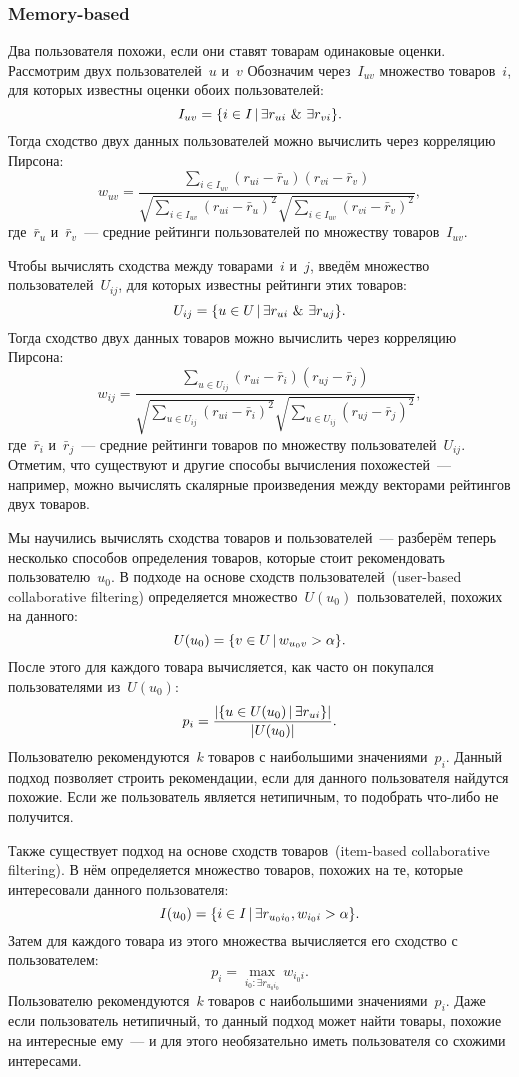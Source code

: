 \documentclass[12pt,fleqn]{article}
\begin{document}
	\subsubsection{Memory-based}
	Два пользователя похожи, если они ставят товарам одинаковые оценки.
	Рассмотрим двух пользователей~$u$ и~$v$
	Обозначим через~$I_{uv}$ множество товаров~$i$, для которых известны
	оценки обоих пользователей:
	\[
	I_{uv}
	=
	\{
	i \in I
	\cond
	\exists r_{ui}
	\ \&\ 
	\exists r_{vi}
	\}.
	\]
	Тогда сходство двух данных пользователей можно вычислить через корреляцию Пирсона:
	\[
	w_{uv}
	=
	\frac{
		\sum_{i \in I_{uv}}
		(r_{ui} - \bar r_u)
		(r_{vi} - \bar r_v)
	}{
		\sqrt{
			\sum_{i \in I_{uv}}
			(r_{ui} - \bar r_u)^2
		}
		\sqrt{
			\sum_{i \in I_{uv}}
			(r_{vi} - \bar r_v)^2
		}
	},
	\]
	где~$\bar r_u$ и~$\bar r_v$~--- средние рейтинги пользователей по множеству товаров~$I_{uv}$.
	
	Чтобы вычислять сходства между товарами~$i$ и~$j$, введём множество пользователей~$U_{ij}$,
	для которых известны рейтинги этих товаров:
	\[
	U_{ij}
	=
	\{
	u \in U
	\cond
	\exists r_{ui}
	\ \&\ 
	\exists r_{uj}
	\}.
	\]
	Тогда сходство двух данных товаров можно вычислить через корреляцию Пирсона:
	\[
	w_{ij}
	=
	\frac{
		\sum_{u \in U_{ij}}
		(r_{ui} - \bar r_i)
		(r_{uj} - \bar r_j)
	}{
		\sqrt{
			\sum_{u \in U_{ij}}
			(r_{ui} - \bar r_i)^2
		}
		\sqrt{
			\sum_{u \in U_{ij}}
			(r_{uj} - \bar r_j)^2
		}
	},
	\]
	где~$\bar r_i$ и~$\bar r_j$~--- средние рейтинги товаров по множеству пользователей~$U_{ij}$.
	Отметим, что существуют и другие способы вычисления похожестей~---
	например, можно вычислять скалярные произведения между векторами рейтингов двух товаров.
	
	Мы научились вычислять сходства товаров и пользователей~---
	разберём теперь несколько способов определения товаров, которые стоит
	рекомендовать пользователю~$u_0$.
	В подходе на основе сходств пользователей~(user-based collaborative filtering)
	определяется множество~$U(u_0)$ пользователей, похожих на данного:
	\[
	U(u_0)
	=
	\{v \in U
	\mspace{3mu}{|}\mspace{3mu}
	w_{u_0 v} > \alpha
	\}.
	\]
	После этого для каждого товара вычисляется, как часто он покупался пользователями из~$U(u_0)$:
	\[
	p_{i}
	=
	\frac{
		|\{u \in U(u_0) \mspace{3mu}{|}\mspace{3mu} \exists r_{ui}\}|
	}{
		|U(u_0)|
	}.
	\]
	Пользователю рекомендуются~$k$ товаров с наибольшими значениями~$p_i$.
	Данный подход позволяет строить рекомендации, если для данного пользователя найдутся похожие.
	Если же пользователь является нетипичным, то подобрать что-либо не получится.
	
	Также существует подход на основе сходств товаров~(item-based collaborative filtering).
	В нём определяется множество товаров, похожих на те, которые интересовали данного пользователя:
	\[
	I(u_0)
	=
	\{
	i \in I
	\mspace{3mu}{|}\mspace{3mu}
	\exists r_{u_0 i_0},
	w_{i_0 i} > \alpha
	\}.
	\]
	Затем для каждого товара из этого множества вычисляется его сходство с пользователем:
	\[
	p_i
	=
	\max_{i_0: \exists r_{u_0 i_0}}
	w_{i_0 i}.
	\]
	Пользователю рекомендуются~$k$ товаров с наибольшими значениями~$p_i$.
	Даже если пользователь нетипичный, то данный подход может найти товары, похожие
	на интересные ему~--- и для этого необязательно иметь пользователя со схожими интересами.
	
\end{document}
